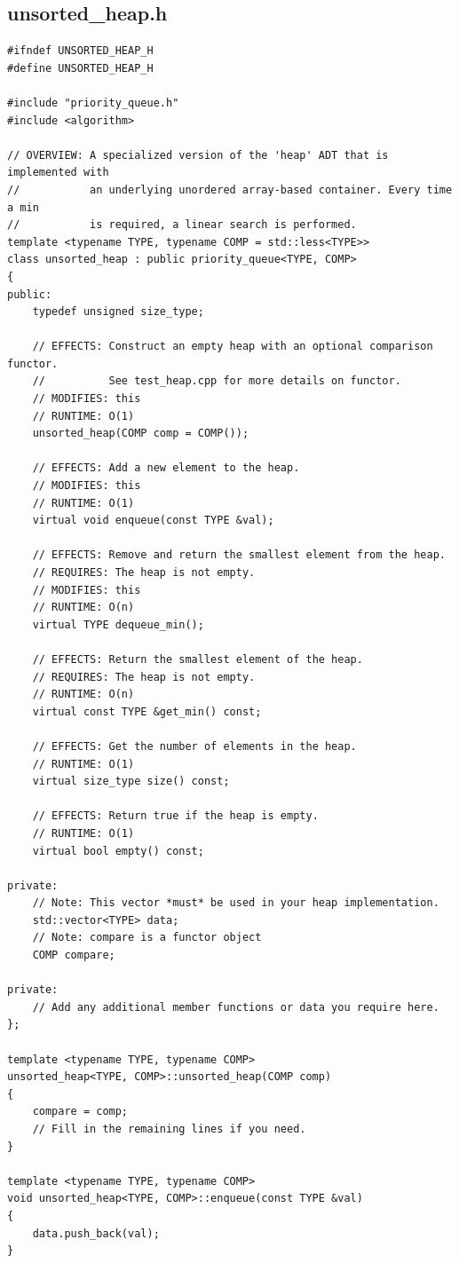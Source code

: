 \documentclass[12pt,a4paper]{article}
\theoremstyle{definition}
\begin{document}
\subsection*{unsorted\_heap.h}
\begin{lstlisting}
#ifndef UNSORTED_HEAP_H
#define UNSORTED_HEAP_H

#include "priority_queue.h"
#include <algorithm>

// OVERVIEW: A specialized version of the 'heap' ADT that is implemented with
//           an underlying unordered array-based container. Every time a min
//           is required, a linear search is performed.
template <typename TYPE, typename COMP = std::less<TYPE>>
class unsorted_heap : public priority_queue<TYPE, COMP>
{
public:
    typedef unsigned size_type;

    // EFFECTS: Construct an empty heap with an optional comparison functor.
    //          See test_heap.cpp for more details on functor.
    // MODIFIES: this
    // RUNTIME: O(1)
    unsorted_heap(COMP comp = COMP());

    // EFFECTS: Add a new element to the heap.
    // MODIFIES: this
    // RUNTIME: O(1)
    virtual void enqueue(const TYPE &val);

    // EFFECTS: Remove and return the smallest element from the heap.
    // REQUIRES: The heap is not empty.
    // MODIFIES: this
    // RUNTIME: O(n)
    virtual TYPE dequeue_min();

    // EFFECTS: Return the smallest element of the heap.
    // REQUIRES: The heap is not empty.
    // RUNTIME: O(n)
    virtual const TYPE &get_min() const;

    // EFFECTS: Get the number of elements in the heap.
    // RUNTIME: O(1)
    virtual size_type size() const;

    // EFFECTS: Return true if the heap is empty.
    // RUNTIME: O(1)
    virtual bool empty() const;

private:
    // Note: This vector *must* be used in your heap implementation.
    std::vector<TYPE> data;
    // Note: compare is a functor object
    COMP compare;

private:
    // Add any additional member functions or data you require here.
};

template <typename TYPE, typename COMP>
unsorted_heap<TYPE, COMP>::unsorted_heap(COMP comp)
{
    compare = comp;
    // Fill in the remaining lines if you need.
}

template <typename TYPE, typename COMP>
void unsorted_heap<TYPE, COMP>::enqueue(const TYPE &val)
{
    data.push_back(val);
}


\end{lstlisting}
\end{document}
